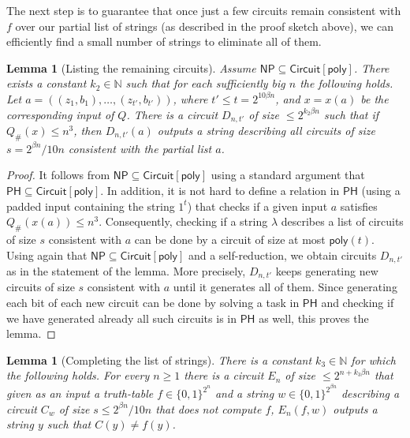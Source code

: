 \documentclass[11pt]{article}
\numberwithin{equation}{section}
\newtheorem{lemma}[theorem]{Lemma}
\theoremstyle{definition}
\theoremstyle{plain}
\begin{document}
The next step is to guarantee that once just a few circuits remain consistent with $f$ over our partial list of strings (as described in the proof sketch above), we can efficiently find a small number of strings to eliminate all of them. 

\begin{lemma}[Listing the remaining circuits]\label{l:printing_remaining_circuits}
Assume $\mathsf{NP} \subseteq \mathsf{Circuit}[\mathsf{poly}]$. There exists a constant $k_2 \in \mathbb{N}$ such that for each sufficiently big $n$ the following holds. Let $a = ((z_1, b_1), \ldots, (z_{t'}, b_{t'}))$, where $t' \leq t=2^{10\beta n}$, and $x = x(a)$ be the corresponding input of $Q$.
There is a circuit $D_{n,t'}$ of size $\leq 2^{k_2 \beta n}$ such that if $Q_{\#}(x) \leq n^3$,  then $D_{n,t'}(a)$ outputs a string describing all circuits of size $s=2^{\beta n}/10n$ consistent with the partial list $a$. 
\end{lemma}

\begin{proof}
It follows from $\mathsf{NP} \subseteq \mathsf{Circuit}[\mathsf{poly}]$ using a standard argument that $\mathsf{PH} \subseteq \mathsf{Circuit}[\mathsf{poly}]$. In addition, it is not hard to define a relation in $\mathsf{PH}$ (using a padded input containing the string $1^{t}$) that checks if a given input $a$ satisfies $Q_{\#}(x(a)) \leq n^3$. Consequently, checking if a string $\lambda$ describes a list of circuits of size $s$ consistent with $a$ can be done by a circuit of size at most $\mathsf{poly}(t)$. Using again that $\mathsf{NP} \subseteq \mathsf{Circuit}[\mathsf{poly}]$ and a self-reduction, we obtain circuits $D_{n,t'}$ as in the statement of the lemma. More precisely, $D_{n,t'}$ keeps generating new circuits of size $s$ consistent with $a$ until it generates all of them. Since generating each bit of each new circuit can be done by solving a task in $\mathsf{PH}$ and checking if we have generated already all such circuits is in $\mathsf{PH}$ as well, this proves the lemma.
\end{proof}

\begin{lemma}[Completing the list of strings]\label{l:printing_remaining_strings}
There is a constant $k_3 \in \mathbb{N}$ for which the following holds. For every $n \geq 1$ there is a circuit $E_n$ of size $\leq 2^{n + k_3 \beta n}$ that given as an input a truth-table $f \in \{0,1\}^{2^n}$ and a string $w \in \{0,1\}^{2^{\beta n}}$ describing a circuit $C_w$ of size $s \leq 2^{\beta n}/10n$ that does not compute $f$, $E_n(f,w)$ outputs a string $y$ such that $C(y) \neq f(y)$.
\end{lemma}
\end{document}
